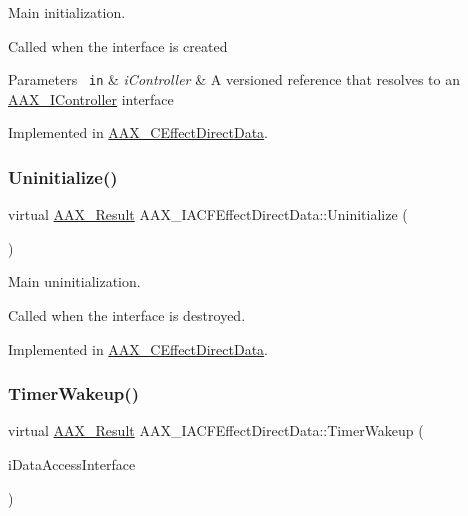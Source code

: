 Main initialization. 

Called when the interface is created


\begin{DoxyParams}[1]{Parameters}
\mbox{\texttt{ in}}  & {\em i\+Controller} & A versioned reference that resolves to an \mbox{\hyperlink{a01789}{A\+A\+X\+\_\+\+I\+Controller}} interface \\
\hline
\end{DoxyParams}


Implemented in \mbox{\hyperlink{a01473_ad89ee93781539d8df3b0710a186c7e0d}{A\+A\+X\+\_\+\+C\+Effect\+Direct\+Data}}.

\mbox{\label{a01661_ad56406a13dd691db6f1117ab97cfc90a}} 
\subsubsection{\texorpdfstring{Uninitialize()}{Uninitialize()}}
{\footnotesize\ttfamily virtual \mbox{\hyperlink{a00392_a4d8f69a697df7f70c3a8e9b8ee130d2f}{A\+A\+X\+\_\+\+Result}} A\+A\+X\+\_\+\+I\+A\+C\+F\+Effect\+Direct\+Data\+::\+Uninitialize (\begin{DoxyParamCaption}{ }\end{DoxyParamCaption})\hspace{0.3cm}{\ttfamily [pure virtual]}}



Main uninitialization. 

Called when the interface is destroyed. 

Implemented in \mbox{\hyperlink{a01473_a49f02465aa623666f9e43a8646d9e56c}{A\+A\+X\+\_\+\+C\+Effect\+Direct\+Data}}.

\mbox{\label{a01661_afb4fa2c566547d7bd303166cf50741bb}} 
\subsubsection{\texorpdfstring{TimerWakeup()}{TimerWakeup()}}
{\footnotesize\ttfamily virtual \mbox{\hyperlink{a00392_a4d8f69a697df7f70c3a8e9b8ee130d2f}{A\+A\+X\+\_\+\+Result}} A\+A\+X\+\_\+\+I\+A\+C\+F\+Effect\+Direct\+Data\+::\+Timer\+Wakeup (\begin{DoxyParamCaption}\item[{\mbox{\hyperlink{a01409}{I\+A\+C\+F\+Unknown}} $\ast$}]{i\+Data\+Access\+Interface }\end{DoxyParamCaption})\hspace{0.3cm}{\ttfamily [pure virtual]}}



